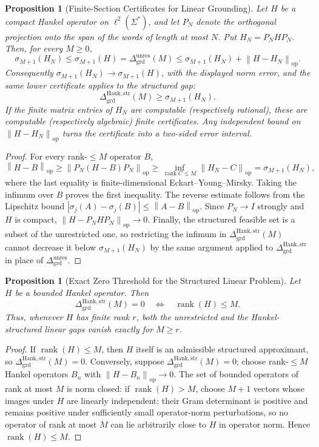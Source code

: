 \documentclass[12pt]{article}
\newtheorem{proposition}[theorem]{Proposition}
\theoremstyle{definition}
\DeclareMathOperator{\rank}{rank}
\newcommand{\norm}[1]{\left\lVert#1\right\rVert}
\newcommand{\Dunres}{\Delta_{\mathrm{grd}}^{\mathrm{unres}}}
\newcommand{\DHankstr}{\Delta_{\mathrm{grd}}^{\mathrm{Hank,str}}}
\begin{document}
\begin{proposition}[Finite-Section Certificates for Linear Grounding]
\label{prop:grounding-finite-section}
Let $H$ be a compact Hankel operator on $\ell^2(\Sigma^*)$, and let $P_N$
denote the orthogonal projection onto the span of the words of length at
most $N$.  Put $H_N=P_NHP_N$.  Then, for every $M\ge0$,
\[
\sigma_{M+1}(H_N)
\le
\sigma_{M+1}(H)
=
\Dunres(M)
\le
\sigma_{M+1}(H_N)+\norm{H-H_N}_{\mathrm{op}}.
\]
Consequently $\sigma_{M+1}(H_N)\to\sigma_{M+1}(H)$, with the displayed norm
error, and the same lower certificate applies to the structured gap:
\[
\DHankstr(M)\ge\sigma_{M+1}(H_N).
\]
If the finite matrix entries of $H_N$ are computable (respectively
rational), these are computable (respectively algebraic) finite
certificates.  Any independent bound on $\norm{H-H_N}_{\mathrm{op}}$ turns
the certificate into a two-sided error interval.
\end{proposition}

\begin{proof}
For every rank-$\le M$ operator $B$,
\[
\norm{H-B}_{\mathrm{op}}
\ge
\norm{P_N(H-B)P_N}_{\mathrm{op}}
\ge
\inf_{\rank C\le M}\norm{H_N-C}_{\mathrm{op}}
=
\sigma_{M+1}(H_N),
\]
where the last equality is finite-dimensional Eckart--Young--Mirsky.  Taking
the infimum over $B$ proves the first inequality.  The reverse estimate
follows from the Lipschitz bound
$|\sigma_j(A)-\sigma_j(B)|\le\norm{A-B}_{\mathrm{op}}$.  Since $P_N\to I$
strongly and $H$ is compact, $\norm{H-P_NHP_N}_{\mathrm{op}}\to0$.  Finally,
the structured feasible set is a subset of the unrestricted one, so
restricting the infimum in $\DHankstr(M)$ cannot decrease it below
$\sigma_{M+1}(H_N)$ by the same argument applied to $\DHankstr$ in place of
$\Dunres$.
\end{proof}

\begin{proposition}[Exact Zero Threshold for the Structured Linear Problem]
\label{prop:grounding-structured-zero}
Let $H$ be a bounded Hankel operator.  Then
\[
\DHankstr(M)=0
\quad\Longleftrightarrow\quad
\operatorname{rank}(H)\le M.
\]
Thus, whenever $H$ has finite rank $r$, both the unrestricted and the
Hankel-structured linear gaps vanish exactly for $M\ge r$.
\end{proposition}

\begin{proof}
If $\operatorname{rank}(H)\le M$, then $H$ itself is an admissible structured
approximant, so $\DHankstr(M)=0$.  Conversely, suppose $\DHankstr(M)=0$;
choose rank-$\le M$ Hankel operators $B_n$ with
$\norm{H-B_n}_{\mathrm{op}}\to0$.  The set of bounded operators of rank at
most $M$ is norm closed: if $\operatorname{rank}(H)>M$, choose $M+1$ vectors
whose images under $H$ are linearly independent; their Gram determinant is
positive and remains positive under sufficiently small operator-norm
perturbations, so no operator of rank at most $M$ can lie arbitrarily close
to $H$ in operator norm.  Hence $\operatorname{rank}(H)\le M$.
\end{proof}
\end{document}
